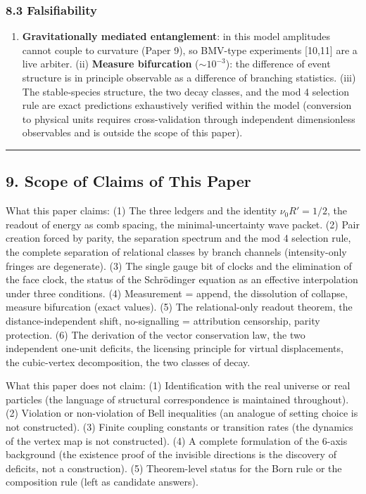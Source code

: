 \documentclass[
]{article}
\providecommand{\tightlist}{%
  \setlength{\itemsep}{0pt}\setlength{\parskip}{0pt}}
\begin{document}
\subsubsection{8.3 Falsifiability}\label{falsifiability}

\begin{enumerate}
\def\labelenumi{(\roman{enumi})}
\tightlist
\item
  \textbf{Gravitationally mediated entanglement}: in this model
  amplitudes cannot couple to curvature (Paper 9), so BMV-type
  experiments {[}10,11{]} are a live arbiter. (ii) \textbf{Measure
  bifurcation} (\(\sim10^{-3}\)): the difference of event structure is
  in principle observable as a difference of branching statistics. (iii)
  The stable-species structure, the two decay classes, and the mod 4
  selection rule are exact predictions exhaustively verified within the
  model (conversion to physical units requires cross-validation through
  independent dimensionless observables and is outside the scope of this
  paper).
\end{enumerate}

\begin{center}\rule{0.5\linewidth}{0.5pt}\end{center}

\subsection{9. Scope of Claims of This
Paper}\label{scope-of-claims-of-this-paper}

What this paper claims: (1) The three ledgers and the identity
\(\nu_0R'=1/2\), the readout of energy as comb spacing, the
minimal-uncertainty wave packet. (2) Pair creation forced by parity, the
separation spectrum and the mod 4 selection rule, the complete
separation of relational classes by branch channels (intensity-only fringes are degenerate). (3) The single gauge bit of
clocks and the elimination of the face clock, the status of the
Schrödinger equation as an effective interpolation under three
conditions. (4) Measurement = append, the dissolution of collapse,
measure bifurcation (exact values). (5) The relational-only readout
theorem, the distance-independent shift, no-signalling = attribution
censorship, parity protection. (6) The derivation of the vector
conservation law, the two independent one-unit deficits, the licensing
principle for virtual displacements, the cubic-vertex decomposition, the
two classes of decay.

What this paper does not claim: (1) Identification with the real
universe or real particles (the language of structural correspondence is
maintained throughout). (2) Violation or non-violation of Bell
inequalities (an analogue of setting choice is not constructed). (3)
Finite coupling constants or transition rates (the dynamics of the
vertex map is not constructed). (4) A complete formulation of the 6-axis
background (the existence proof of the invisible directions is the
discovery of deficits, not a construction). (5) Theorem-level status for
the Born rule or the composition rule (left as candidate answers).
\end{document}

